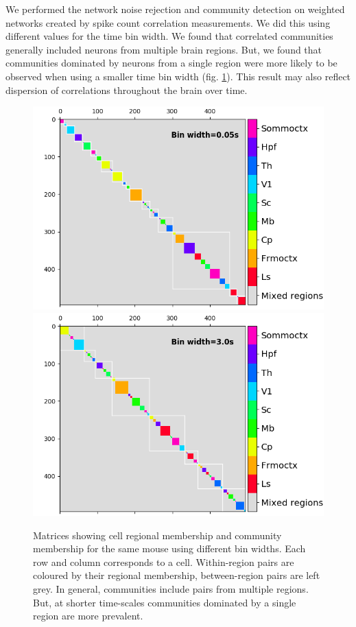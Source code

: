 \documentclass[a4paper,12pt]{article}
\theoremstyle{definition}
\begin{document}
We performed the network noise rejection and community detection on weighted networks created by spike count correlation measurements. We did this using different values for the time bin width. We found that correlated communities generally included neurons from multiple brain regions. But, we found that communities dominated by neurons from a single region were more likely to be observed when using a smaller time bin width (fig. \ref{fig:regional_cluster_maps}). This result may also reflect dispersion of correlations throughout the brain over time.

\begin{figure}[t!]
    \centering
    \includegraphics[width=0.45\columnwidth]{images/Krebs_0p05_regional_cluster_map.png}
    \includegraphics[width=0.45\columnwidth]{images/Krebs_3p0_regional_cluster_map.png}
    \vspace{-0.3cm}
    \caption{Matrices showing cell regional membership and community membership for the same mouse using different bin widths. Each row and column corresponds to a cell. Within-region pairs are coloured by their regional membership, between-region pairs are left grey. In general, communities include pairs from multiple regions. But, at shorter time-scales communities dominated by a single region are more prevalent.}
    \vspace{-0.4cm}
    \label{fig:regional_cluster_maps}
\end{figure}


\vspace{-0.5cm}


\end{document}
